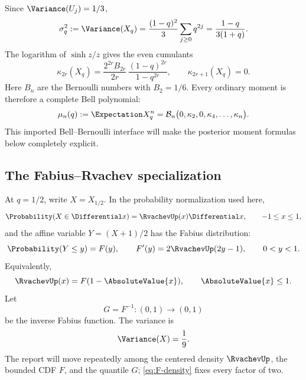 \documentclass[11pt,oneside]{article}
\theoremstyle{definition}
\theoremstyle{remark}
\begin{document}
Since $\Variance(U_j)=1/3$,
\begin{equation}
 \sigma_q^2:=\Variance(X_q)=\frac{(1-q)^2}{3}\sum_{j\ge0}q^{2j}
 =\frac{1-q}{3(1+q)}.
 \label{eq:variance}
\end{equation}
The logarithm of $\sinh z/z$ gives the even cumulants
\begin{equation}
 \kappa_{2r}(X_q)
 =\frac{2^{2r}B_{2r}}{2r}\,
   \frac{(1-q)^{2r}}{1-q^{2r}},
 \qquad
 \kappa_{2r+1}(X_q)=0.
 \label{eq:cumulants}
\end{equation}
Here $B_n$ are the Bernoulli numbers with $B_2=1/6$.  Every ordinary moment is
therefore a complete Bell polynomial:
\begin{equation}
 \mu_n(q):=\Expectation X_q^n
 =\mathcal B_n\bigl(0,\kappa_2,0,\kappa_4,\ldots,\kappa_n\bigr).
 \label{eq:Bell-moments}
\end{equation}
This imported Bell--Bernoulli interface will make the posterior moment formulas
below completely explicit.

\subsection{The Fabius--Rvachev specialization}

At $q=1/2$, write $X=X_{1/2}$.  In the probability normalization used here,
\begin{equation}
 \Probability(X\in\Differential x)=\RvachevUp(x)\Differential x,
 \qquad -1\le x\le1,
 \label{eq:up-density}
\end{equation}
and the affine variable $Y=(X+1)/2$ has the Fabius distribution:
\begin{equation}
 \Probability(Y\le y)=F(y),
 \qquad F'(y)=2\RvachevUp(2y-1),
 \qquad 0<y<1.
 \label{eq:F-density}
\end{equation}
Equivalently,
\begin{equation}
 \RvachevUp(x)=F(1-\AbsoluteValue{x}),\qquad \AbsoluteValue{x}\le1.
 \label{eq:up-F}
\end{equation}
Let
\begin{equation}
 G=F^{-1}:(0,1)\longrightarrow(0,1)
 \label{eq:G}
\end{equation}
be the inverse Fabius function.  The variance is
\begin{equation}
 \Variance(X)=\frac19.
 \label{eq:dyadic-var}
\end{equation}
The report will move repeatedly among the centered density $\RvachevUp$, the bounded CDF
$F$, and the quantile $G$; \eqref{eq:F-density} fixes every factor of two.
\end{document}
